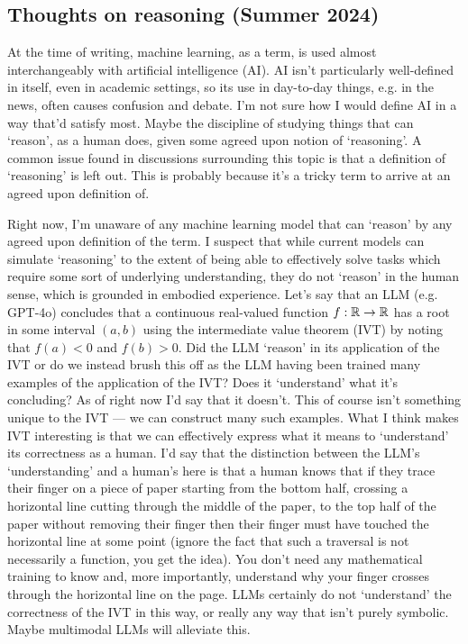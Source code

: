 \documentclass[11pt]{article}
\begin{document}
\begin{appendices}
\subsection{Thoughts on reasoning (Summer 2024)}

At the time of writing, machine learning, as a term, is used almost interchangeably with artificial intelligence (AI). AI isn't particularly well-defined in itself, even in academic settings, so its use in day-to-day things, e.g. in the news, often causes confusion and debate. I'm not sure how I would define AI in a way that'd satisfy most. Maybe the discipline of studying things that can `reason', as a human does, given some agreed upon notion of `reasoning'. A common issue found in discussions surrounding this topic is that a definition of `reasoning' is left out. This is probably because it's a tricky term to arrive at an agreed upon definition of.

Right now, I'm unaware of any machine learning model that can `reason' by any agreed upon definition of the term. I suspect that while current models can simulate `reasoning' to the extent of being able to effectively solve tasks which require some sort of underlying understanding, they do not `reason' in the human sense, which is grounded in embodied experience. Let's say that an LLM (e.g. GPT-4o) concludes that a continuous real-valued function $f:\mathbb{R}\rightarrow\mathbb{R}$ has a root in some interval $(a, b)$ using the intermediate value theorem (IVT) by noting that $f(a)<0$ and $f(b)>0$. Did the LLM `reason' in its application of the IVT or do we instead brush this off as the LLM having been trained many examples of the application of the IVT? Does it `understand' what it's concluding? As of right now I'd say that it doesn't. This of course isn't something unique to the IVT — we can construct many such examples. What I think makes IVT interesting is that we can effectively express what it means to `understand' its correctness as a human. I'd say that the distinction between the LLM's `understanding' and a human's here is that a human knows that if they trace their finger on a piece of paper starting from the bottom half, crossing a horizontal line cutting through the middle of the paper, to the top half of the paper without removing their finger then their finger must have touched the horizontal line at some point (ignore the fact that such a traversal is not necessarily a function, you get the idea). You don't need any mathematical training to know and, more importantly, understand why your finger crosses through the horizontal line on the page. LLMs certainly do not `understand' the correctness of the IVT in this way, or really any way that isn't purely symbolic. Maybe multimodal LLMs will alleviate this.


\end{appendices}
\end{document}
